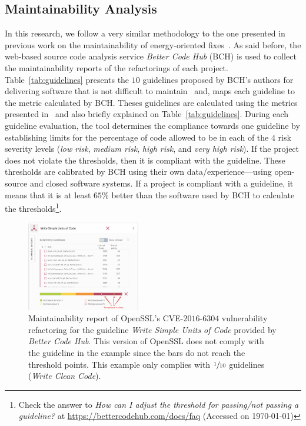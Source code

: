 \documentclass[10pt,conference]{IEEEtran}
\begin{document}
\subsection{Maintainability Analysis}

In this research, we follow a very similar methodology to the one presented 
in previous work on the maintainability of energy-oriented fixes~\cite{cruz2019energyoriented}. 
As said before, the web-based source code analysis service \emph{Better Code
Hub} (BCH) is used to collect the maintainability reports of the refactorings of
each project. Table~\ref{tab:guidelines} presents the $10$ guidelines proposed
by BCH's authors for delivering software that is not difficult to
maintain~\cite{Visser:2016:OREILLY} and, maps each guideline to the metric 
calculated by BCH. Theses guidelines are calculated using the metrics 
presented in~\cite{criteria:2017} and also briefly explained on Table~\ref{tab:guidelines}. 
During each guideline evaluation, the tool determines the compliance towards 
one guideline by establishing limits for the percentage of code allowed to be 
in each of the $4$ risk severity levels
(\emph{low risk}, \emph{medium risk}, \emph{high risk}, and \emph{very high
risk}). If the project does not violate the thresholds, then it is compliant
with the guideline. These thresholds are calibrated by BCH using their own
data/experience---using open-source and closed software systems. If a project is
compliant with a guideline, it means that it is at least $65\%$ better than the
software used by BCH to calculate the thresholds\footnote{Check the answer to
\emph{How can I adjust the threshold for passing/not passing a guideline?} at
\url{https://bettercodehub.com/docs/faq} (Accessed on \today{})}.

\begin{figure}[h]
 	\centering 	
	\includegraphics[width=0.44\textwidth]{figures/bch_report.png}
 	\caption{Maintainability report of OpenSSL's CVE-$2016$-$6304$ vulnerability
refactoring for the guideline \emph{Write Simple Units of Code} provided by
\emph{Better Code Hub}. This version of OpenSSL does not comply with the
guideline in the example since the bars do not reach the threshold points. This
example only complies with $\sfrac{1}{10}$ guidelines (\emph{Write Clean Code}).}
	\label{fig:bchrep}
	\vspace{-0.2cm}
\end{figure}
\end{document}
